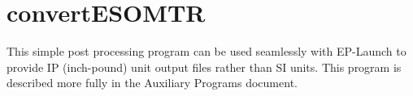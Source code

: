 \section{convertESOMTR}\label{convertesomtr}

This simple post processing program can be used seamlessly with EP-Launch to provide IP (inch-pound) unit output files rather than SI units. This program is described more fully in the Auxiliary Programs document.
